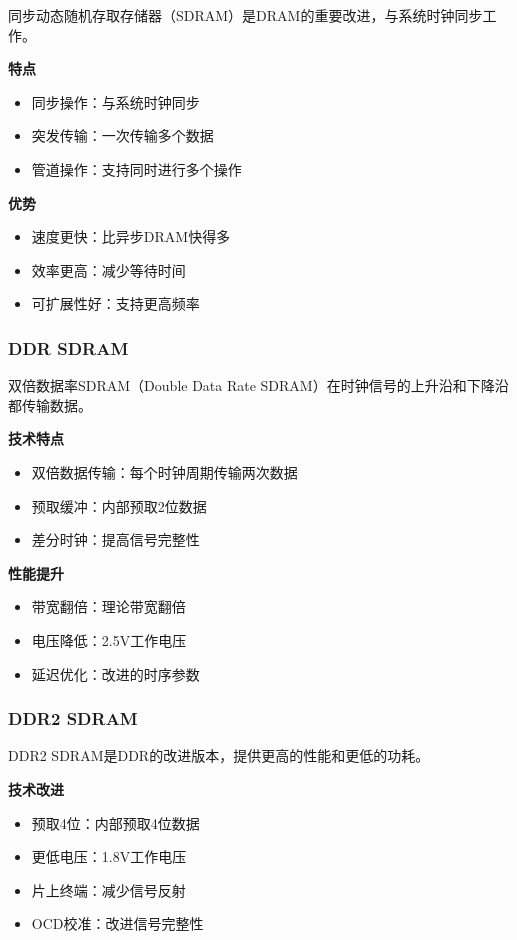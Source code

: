 \documentclass{article}
\begin{document}
同步动态随机存取存储器（SDRAM）是DRAM的重要改进，与系统时钟同步工作。

\textbf{特点}
\begin{itemize}
    \item 同步操作：与系统时钟同步
    \item 突发传输：一次传输多个数据
    \item 管道操作：支持同时进行多个操作
\end{itemize}

\textbf{优势}
\begin{itemize}
    \item 速度更快：比异步DRAM快得多
    \item 效率更高：减少等待时间
    \item 可扩展性好：支持更高频率
\end{itemize}

\subsubsection{DDR SDRAM}

双倍数据率SDRAM（Double Data Rate SDRAM）在时钟信号的上升沿和下降沿都传输数据。

\textbf{技术特点}
\begin{itemize}
    \item 双倍数据传输：每个时钟周期传输两次数据
    \item 预取缓冲：内部预取2位数据
    \item 差分时钟：提高信号完整性
\end{itemize}

\textbf{性能提升}
\begin{itemize}
    \item 带宽翻倍：理论带宽翻倍
    \item 电压降低：2.5V工作电压
    \item 延迟优化：改进的时序参数
\end{itemize}

\subsubsection{DDR2 SDRAM}

DDR2 SDRAM是DDR的改进版本，提供更高的性能和更低的功耗。

\textbf{技术改进}
\begin{itemize}
    \item 预取4位：内部预取4位数据
    \item 更低电压：1.8V工作电压
    \item 片上终端：减少信号反射
    \item OCD校准：改进信号完整性
\end{itemize}
\end{document}
